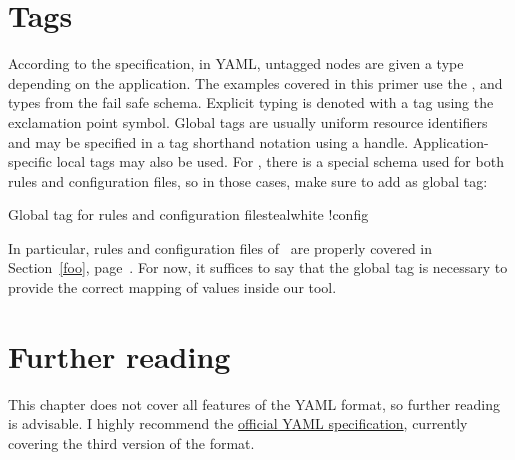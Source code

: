 \section{Tags}
\label{sec:yamltags}

According to the specification, in YAML, untagged nodes are given a type depending on the application. The examples covered in this primer use the ,  and  types from the fail safe schema. Explicit typing is denoted with a tag using the exclamation point symbol. Global tags are usually uniform resource identifiers and may be specified in a tag shorthand notation using a handle. Application-specific local tags may also be used. For \arara, there is a special schema used for both rules and configuration files, so in those cases, make sure to add  as global tag:

\begin{codebox}{Global tag for rules and configuration files}{teal}{\icnote}{white}
!config
\end{codebox}

In particular, rules and configuration files of \arara\ are properly covered in Section~\ref{foo}, page~\pageref{foo}. For now, it suffices to say that the  global tag is necessary to provide the correct mapping of values inside our tool.

\section{Further reading}
\label{sec:yamlfurtherreading}

This chapter does not cover all features of the YAML format, so further reading is advisable. I highly recommend the \href{http://yaml.org/spec/1.2/spec.html}{official YAML specification}, currently covering the third version of the format.
